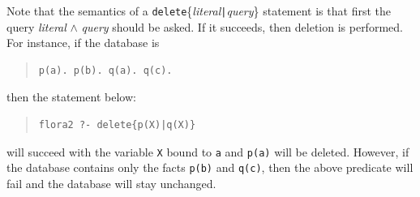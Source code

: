 \documentclass[11pt]{article}
\begin{document}
Note that the semantics of a {\tt delete}\{\emph{literal}{\tt |}{\it query}\}
statement is that first the query \emph{literal} $\wedge$ \emph{query} should
be asked. If it succeeds, then deletion is performed. For instance, if the
database is
\begin{quote}
\begin{verbatim}
p(a). p(b). q(a). q(c).
\end{verbatim}
\end{quote}
then the statement below:
\begin{quote}
\begin{verbatim}
flora2 ?- delete{p(X)|q(X)}
\end{verbatim}
\end{quote}
will succeed with the variable {\tt X} bound to {\tt a} and {\tt p(a)} will
be deleted.  However, if the database contains only the facts {\tt p(b)}
and {\tt q(c)}, then the above predicate will fail and the database will
stay unchanged.
\end{document}
